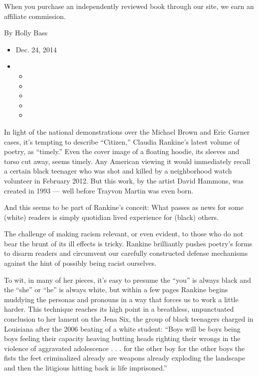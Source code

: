 When you purchase an independently reviewed book through our site, we
earn an affiliate commission.

By Holly Bass

\begin{itemize}
\item
  Dec. 24, 2014
\item
  \begin{itemize}
  \item
  \item
  \item
  \item
  \item
  \end{itemize}
\end{itemize}

In light of the national demonstrations over the Michael Brown and Eric
Garner cases, it's tempting to describe ``Citizen,'' Claudia Rankine's
latest volume of poetry, as ``timely.'' Even the cover image of a
floating hoodie, its sleeves and torso cut away, seems timely. Any
American viewing it would immediately recall a certain black teenager
who was shot and killed by a neighborhood watch volunteer in February
2012. But this work, by the artist David Hammons, was created in 1993
--- well before Trayvon Martin was even born.

And this seems to be part of Rankine's conceit: What passes as news for
some (white) readers is simply quotidian lived experience for (black)
others.

The challenge of making racism relevant, or even evident, to those who
do not bear the brunt of its ill effects is tricky. Rankine brilliantly
pushes poetry's forms to disarm readers and circumvent our carefully
constructed defense mechanisms against the hint of possibly being racist
ourselves.

To wit, in many of her pieces, it's easy to presume the ``you'' is
always black and the ``she'' or ``he'' is always white, but within a few
pages Rankine begins muddying the personas and pronouns in a way that
forces us to work a little harder. This technique reaches its high point
in a breathless, unpunctuated conclusion to her lament on the Jena Six,
the group of black teenagers charged in Louisiana after the 2006 beating
of a white student: ``Boys will be boys being boys feeling their
capacity heaving butting heads righting their wrongs in the violence of
aggravated adolescence . . . for the other boy for the other boys the
fists the feet criminalized already are weapons already exploding the
landscape and then the litigious hitting back is life imprisoned.''

